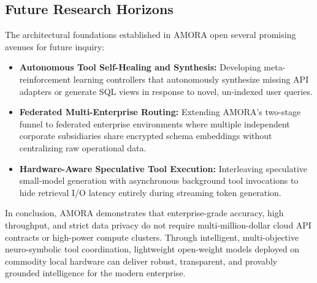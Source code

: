 \subsection{Future Research Horizons}
The architectural foundations established in AMORA open several promising avenues for future inquiry:
\begin{itemize}
    \item \textbf{Autonomous Tool Self-Healing and Synthesis:} Developing meta-reinforcement learning controllers that autonomously synthesize missing API adapters or generate SQL views in response to novel, un-indexed user queries.
    \item \textbf{Federated Multi-Enterprise Routing:} Extending AMORA's two-stage funnel to federated enterprise environments where multiple independent corporate subsidiaries share encrypted schema embeddings without centralizing raw operational data.
    \item \textbf{Hardware-Aware Speculative Tool Execution:} Interleaving speculative small-model generation with asynchronous background tool invocations to hide retrieval I/O latency entirely during streaming token generation.
\end{itemize}

In conclusion, AMORA demonstrates that enterprise-grade accuracy, high throughput, and strict data privacy do not require multi-million-dollar cloud API contracts or high-power compute clusters. Through intelligent, multi-objective neuro-symbolic tool coordination, lightweight open-weight models deployed on commodity local hardware can deliver robust, transparent, and provably grounded intelligence for the modern enterprise.
